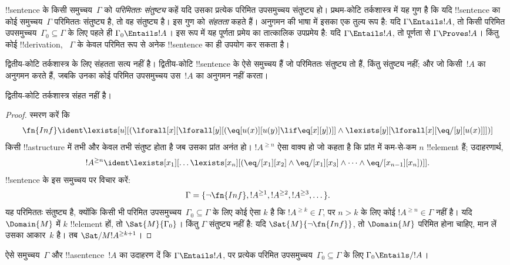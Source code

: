 \documentclass[../../../include/open-logic-section]{subfiles}
\begin{document}


\begin{explain}
!!{sentence} के किसी समुच्चय~$\Gamma$ को \emph{परिमिततः संतुष्ट्य} कहें यदि
उसका प्रत्येक परिमित उपसमुच्चय संतुष्ट्य हो। प्रथम-कोटि तर्कशास्त्र में यह
गुण है कि यदि !!{sentence} का कोई समुच्चय~$\Gamma$ परिमिततः संतुष्ट्य है,
तो वह संतुष्ट्य है। इस गुण को \emph{संहतता} कहते हैं। अनुगमन की भाषा में
इसका एक तुल्य रूप है: यदि $\Gamma \Entails !A$, तो किसी परिमित
उपसमुच्चय~$\Gamma_0 \subseteq \Gamma$ के लिए पहले ही $\Gamma_0 \Entails
!A$। इस रूप में यह पूर्णता प्रमेय का तात्कालिक उपप्रमेय है: यदि $\Gamma
\Entails !A$, तो पूर्णता से $\Gamma \Proves !A$। किंतु कोई !!{derivation},
~$\Gamma$ के केवल परिमित रूप से अनेक !!{sentence} का ही उपयोग कर सकता है।

द्वितीय-कोटि तर्कशास्त्र के लिए संहतता सत्य नहीं है। द्वितीय-कोटि
!!{sentence} के ऐसे समुच्चय हैं जो परिमिततः संतुष्ट्य तो हैं, किंतु संतुष्ट्य
नहीं; और जो किसी~$!A$ का अनुगमन करते हैं, जबकि उनका कोई परिमित उपसमुच्चय
उस~$!A$ का अनुगमन नहीं करता।
\end{explain}


\begin{thm}
द्वितीय-कोटि तर्कशास्त्र संहत नहीं है।
\end{thm}

\begin{proof}
स्मरण करें कि
\[
\fn{Inf} \ident \lexists[u][(\lforall[x][\lforall[y][(\eq[u(x)][u(y)]
      \lif \eq[x][y])]] \land \lexists[y][\lforall[x][\eq/[y][u(x)]]])]
\]
किसी !!a{structure} में तभी और केवल तभी संतुष्ट होता है जब उसका प्रांत
अनंत हो। $!A^{\ge n}$ ऐसा वाक्य हो जो कहता है कि प्रांत में कम-से-कम
$n$ !!{element} हैं; उदाहरणार्थ,
\[
!A^{\ge n} \ident \lexists[x_1][\dots\lexists[x_n][(\eq/[x_1][x_2]
    \land \eq/[x_1][x_3] \land \dots \land \eq/[x_{n-1}][x_n])]].
\]
!!{sentence} के इस समुच्चय पर विचार करें:
\[
\Gamma = \{\lnot \fn{Inf}, !A^{\ge 1}, !A^{\ge 2}, !A^{\ge 3}, \dots\}.
\]
यह परिमिततः संतुष्ट्य है, क्योंकि किसी भी परिमित उपसमुच्चय~$\Gamma_0
\subseteq \Gamma$ के लिए कोई ऐसा $k$ है कि $!A^{\ge k} \in \Gamma$,
पर $n>k$ के लिए कोई $!A^{\ge n} \in \Gamma$ नहीं है। यदि $\Domain{M}$
में $k$ !!{element} हों, तो $\Sat{M}{\Gamma_0}$। किंतु $\Gamma$ संतुष्ट्य
नहीं है: यदि $\Sat{M}{\lnot \fn{Inf}}$, तो $\Domain{M}$ परिमित होना चाहिए,
मान लें उसका आकार~$k$ है। तब $\Sat/{M}{!A^{\ge k+1}}$।
\end{proof}

\begin{prob}
ऐसे समुच्चय~$\Gamma$ और !!a{sentence}~$!A$ का उदाहरण दें कि
$\Gamma \Entails !A$, पर प्रत्येक परिमित उपसमुच्चय~$\Gamma_0 \subseteq
\Gamma$ के लिए $\Gamma_0 \Entails/ !A$।
\end{prob}
\end{document}
